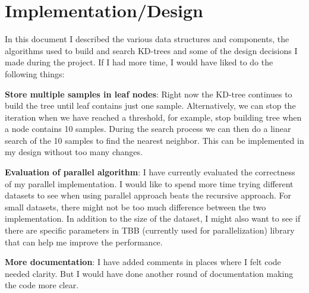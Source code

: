\documentclass[11pt]{amsart}
\begin{document}
\section{Implementation/Design}
\label{sec:conclusion}
In this document I described the various data structures and components, the algorithms used to build and search KD-trees and some of the design decisions I made during the project. If I had more time, I would have liked to do the following things:
\begin{list}{}{\leftmargin= 1.4cm} \setlength\itemsep{1em}
\item \textbf{Store multiple samples in leaf nodes}: Right now the KD-tree continues to build the tree until leaf contains just one sample. Alternatively, we can stop the iteration when we have reached a threshold, for example, stop building tree when a node contains 10 samples. During the search process we can then do a linear search of the 10 samples to find the nearest neighbor. This can be implemented in my design without too many changes.
\item \textbf{Evaluation of parallel algorithm}: I have currently evaluated the correctness of my parallel implementation. I would like to spend more time trying different datasets to see when using parallel approach beats the recursive approach. For small datasets, there might not be too much difference between the two implementation. In addition to the size of the dataset, I might also want to see if there are specific parameters in TBB \cite{Reinders:2007:ITB:1461409} (currently used for parallelization) library that can help me improve the performance.
\item \textbf{More documentation}: I have added comments in places where I felt code needed clarity. But I would have done another round of documentation making the code more clear. 
\end{list}

 
 
\end{document}
